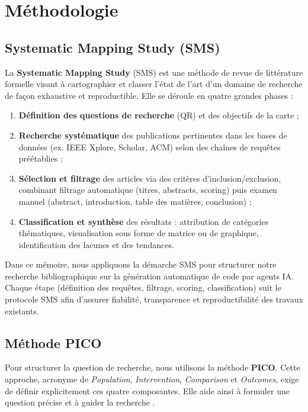 \chapter{Méthodologie}

\section{Systematic Mapping Study (SMS)}

La \textbf{Systematic Mapping Study} (SMS) est une méthode de revue de littérature formelle visant à cartographier et classer l’état de l’art d’un domaine de recherche de façon exhaustive et reproductible. Elle se déroule en quatre grandes phases :

\begin{enumerate}
  \item \textbf{Définition des questions de recherche} (QR) et des objectifs de la carte ;
  \item \textbf{Recherche systématique} des publications pertinentes dans les bases de données (ex. IEEE Xplore, Scholar, ACM) selon des chaînes de requêtes préétablies ;
  \item \textbf{Sélection et filtrage} des articles via des critères d’inclusion/exclusion, combinant filtrage automatique (titres, abstracts, scoring) puis examen manuel (abstract, introduction, table des matières, conclusion) ;
  \item \textbf{Classification et synthèse} des résultats : attribution de catégories thématiques, visualisation sous forme de matrice ou de graphique, identification des lacunes et des tendances.
\end{enumerate}

Dans ce mémoire, nous appliquons la démarche SMS pour structurer notre recherche bibliographique sur la génération automatique de code par agents IA. Chaque étape (définition des requêtes, filtrage, scoring, classification) suit le protocole SMS afin d'assurer fiabilité, transparence et reproductibilité des travaux existants.


\section{Méthode PICO}

Pour structurer la question de recherche, nous utilisons la méthode \textbf{PICO}.
Cette approche, acronyme de 
\textit{Population}, \textit{Intervention}, \textit{Comparison} et \textit{Outcomes},
exige de définir explicitement ces quatre composantes. Elle aide ainsi à formuler une question précise et à guider la recherche .

